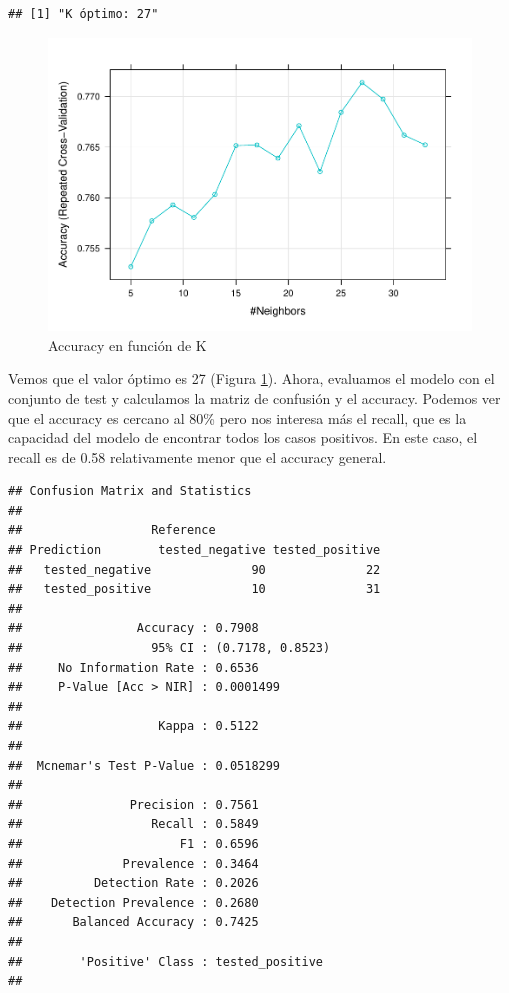 \documentclass[
]{article}
\begin{document}
\begin{verbatim}
## [1] "K óptimo: 27"
\end{verbatim}

\begin{figure}

{\centering \includegraphics[width=0.5\linewidth]{pima-clasificacion_files/figure-latex/k_plot-1} 

}

\caption{Accuracy en función de K}\label{fig:k_plot}
\end{figure}

Vemos que el valor óptimo es 27 (Figura \ref{fig:k_plot}). Ahora,
evaluamos el modelo con el conjunto de test y calculamos la matriz de
confusión y el accuracy. Podemos ver que el accuracy es cercano al 80\%
pero nos interesa más el recall, que es la capacidad del modelo de
encontrar todos los casos positivos. En este caso, el recall es de 0.58
relativamente menor que el accuracy general.

\begin{verbatim}
## Confusion Matrix and Statistics
## 
##                  Reference
## Prediction        tested_negative tested_positive
##   tested_negative              90              22
##   tested_positive              10              31
##                                           
##                Accuracy : 0.7908          
##                  95% CI : (0.7178, 0.8523)
##     No Information Rate : 0.6536          
##     P-Value [Acc > NIR] : 0.0001499       
##                                           
##                   Kappa : 0.5122          
##                                           
##  Mcnemar's Test P-Value : 0.0518299       
##                                           
##               Precision : 0.7561          
##                  Recall : 0.5849          
##                      F1 : 0.6596          
##              Prevalence : 0.3464          
##          Detection Rate : 0.2026          
##    Detection Prevalence : 0.2680          
##       Balanced Accuracy : 0.7425          
##                                           
##        'Positive' Class : tested_positive 
## 
\end{verbatim}
\end{document}
